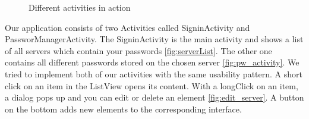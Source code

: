 \documentclass{report}
\begin{document}
\begin{figure}
	\centering
	\hfill
	\hfill
	\caption{Different activities in action}
\end{figure}
Our application consists of two Activities called SigninActivity and PassworManagerActivity. The SigninActivity is the main activity and shows a list of all servers which contain your passwords \ref{fig:serverList}. The other one contains all different passwords stored on the chosen server \ref{fig:pw_activity}.
We tried to implement both of our activities with the same usability pattern. A short click on an item in the ListView opens its content. With a longClick on an item, a dialog pops up and you can edit or delete an element \ref{fig:edit_server}. A button on the bottom adds new elements to the corresponding interface.  
\end{document}
